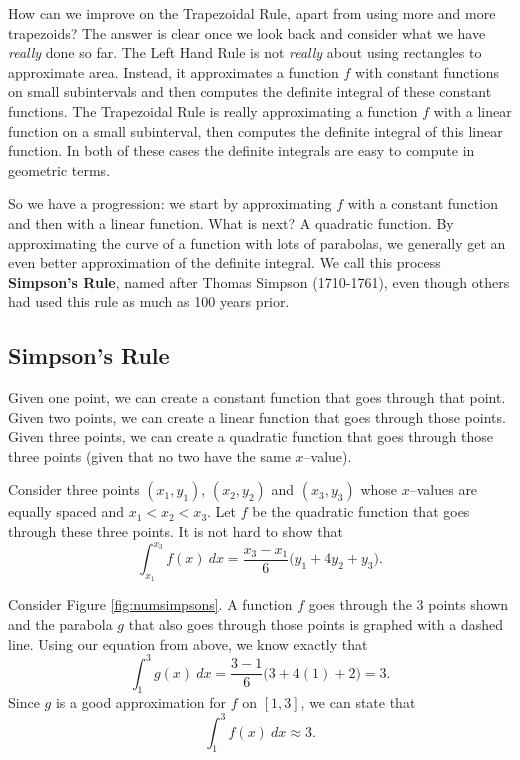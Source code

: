 How can we improve on the Trapezoidal Rule, apart from using more and more trapezoids? The answer is clear once we look back and consider what we have \textit{really} done so far. The Left Hand Rule is not \textit{really} about using rectangles to approximate area. Instead, it approximates a function $f$ with constant functions on small subintervals and then computes the definite integral of these constant functions. The Trapezoidal Rule is really approximating a function $f$ with a linear function on a small subinterval, then computes the definite integral of this linear function. In both of these cases the definite integrals are easy to compute in geometric terms.

So we have a progression: we start by approximating $f$ with a constant function and then with a linear function. What is next? A quadratic function. By approximating the curve of a function with lots of parabolas, we generally get an even better approximation of the definite integral. We call this process \textbf{Simpson's Rule}, named after Thomas Simpson (1710-1761), even though others had used this rule as much as 100 years prior.\\

\subsection{ Simpson's Rule}


Given one point, we can create a constant function that goes through that point. Given two points, we can create a linear function that goes through those points. Given three points, we can create a quadratic function that goes through those three points (given that no two have the same $x$--value).

Consider three points $(x_1,y_1)$, $(x_2,y_2)$ and $(x_3,y_3)$ whose $x$--values are equally spaced and $x_1<x_2<x_3$. Let $f$ be the quadratic function that goes through these three points. It is not hard to show that 
\begin{equation}
\int_{x_1}^{x_3} f(x)\ dx = \frac{x_3-x_1}{6}\big(y_1+4y_2+y_3\big).\label{eq:simpsons}
\end{equation}

Consider Figure \ref{fig:numsimpsons}. A function $f$ goes through the 3 points shown and the parabola $g$ that also goes through those points is graphed with a dashed line. Using our equation from above, we know exactly that $$\int_1^3 g(x) \ dx = \frac{3-1}{6}\big(3+4(1)+2\big)= 3.$$ Since $g$ is a good approximation for $f$ on $[1,3]$, we can state that $$\int_1^3 f(x)\ dx \approx 3.$$

